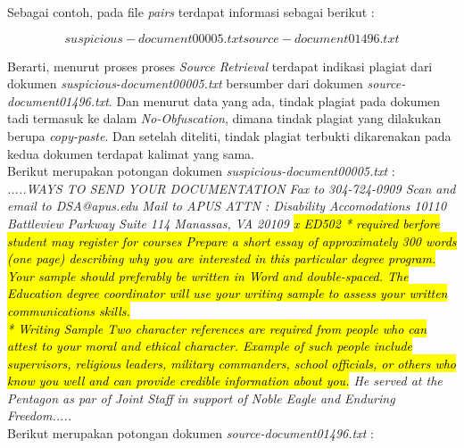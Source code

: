 \documentclass[../Proposal.tex]{subfiles}
\begin{document}
	Sebagai contoh, pada file \textit{pairs} terdapat informasi sebagai berikut : 
	
	\begin{center}
		\centering
		\begin{equation}
		suspicious-document00005.txt source-document01496.txt
		\end{equation}
	\end{center}
	
	\noindent Berarti, menurut proses proses \textit{Source Retrieval} terdapat indikasi plagiat dari dokumen \textit{suspicious-document00005.txt} bersumber dari dokumen \textit{source-document01496.txt}. Dan menurut data yang ada, tindak plagiat pada dokumen tadi termasuk ke dalam \textit{No-Obfuscation}, dimana tindak plagiat yang dilakukan berupa \textit{copy-paste}. Dan setelah diteliti, tindak plagiat terbukti dikarenakan pada kedua dokumen terdapat kalimat yang sama. \\
	
	\noindent Berikut merupakan potongan dokumen \textit{suspicious-document00005.txt} : \\
	
	\textit{.....WAYS TO SEND YOUR DOCUMENTATION Fax to 304-724-0909 Scan and email to DSA@apus.edu Mail to APUS ATTN : Disability Accomodations 10110 Battleview Parkway Suite 114 Manassas, VA 20109 \hl{x ED502 * required berfore student may register for courses Prepare a short essay of approximately 300 words (one page) describing why you are interested in this particular degree program. Your sample should preferably be written in Word and double-spaced. The Education degree coordinator will use your writing sample to assess your written communications skills.\\ * Writing Sample Two character references are required from people who can attest to your moral and ethical character. Example of such people include supervisors, religious leaders, military commanders, school officials, or others who know you well and can provide credible information about you.} He served at the Pentagon as par of Joint Staff in support of Noble Eagle and Enduring Freedom.....} \\
	
	\noindent Berikut merupakan potongan dokumen \textit{source-document01496.txt} : \\
	
\end{document}
